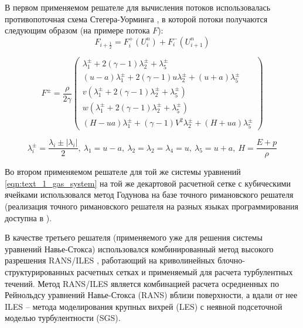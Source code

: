В первом применяемом решателе для вычисления потоков использовалась противопоточная схема Стегера-Уорминга \cite{Smirnova2018Euler}, в которой потоки получаются следующим образом (на примере потока $F$):
\begin{equation}
	F_{i + \frac{1}{2}} = F_i^{+}(U_i^n) + F_i^{-}(U_{i + 1}^n)
\end{equation}

\begin{equation}
	F^{\pm} = \frac{\rho}{2 \gamma}
	\begin{pmatrix}
		\lambda_1^{\pm} + 2(\gamma - 1)\lambda_2^{\pm} + \lambda_5^{\pm} \\
		(u - a)\lambda_1^{\pm} + 2(\gamma - 1)u\lambda_2^{\pm} + (u + a)\lambda_5^{\pm} \\
		v(\lambda_1^{\pm} + 2(\gamma - 1)\lambda_2^{\pm} + \lambda_5^{\pm}) \\
		w(\lambda_1^{\pm} + 2(\gamma - 1)\lambda_2^{\pm} + \lambda_5^{\pm}) \\
		(H - ua)\lambda_1^{\pm} + (\gamma - 1)V^2\lambda_2^{\pm} + (H + ua)\lambda_5^{\pm}
	\end{pmatrix}
\end{equation}

\begin{equation}
	\lambda_i^{\pm} = \frac{\lambda_i \pm |\lambda_i|}{2}, \ \lambda_1 = u - a, \ \lambda_2 = \lambda_2 = \lambda_4 = u, \ \lambda_5 = u + a, \ H = \frac{E + p}{\rho}
\end{equation}

Во втором применяемом решателе для той же системы уравнений \eqref{eqn:text_1_gas_system} на той же декартовой расчетной сетке с кубическими ячейками использовался метод Годунова \cite{Kulikovsky2001Gas} на базе точного римановского решателя \cite{Borisov2018Riemann} (реализация точного римановского решателя на разных языках программирования доступна в \cite{Toro1999Riemann,riemannvecGithub}).

В качестве третьего решателя (применяемого уже для решения системы уравнений Навье-Стокса) использовался комбинированный метод высокого разрешения RANS/ILES \cite{Bendersky2014RANSILES}, работающий на криволинейных блочно-структурированных расчетных сетках и применяемый для расчета турбулентных течений.
Метод RANS/ILES является комбинацией расчета осредненных по Рейнольдсу уравнений Навье-Стокса (RANS\label{abbr:rans}) вблизи поверхности, а вдали от нее ILES\label{abbr:iles} -- метода моделирования крупных вихрей (LES\label{abbr:les}) с неявной подсеточной моделью турбулентности (SGS\label{abbr:sgs}).
